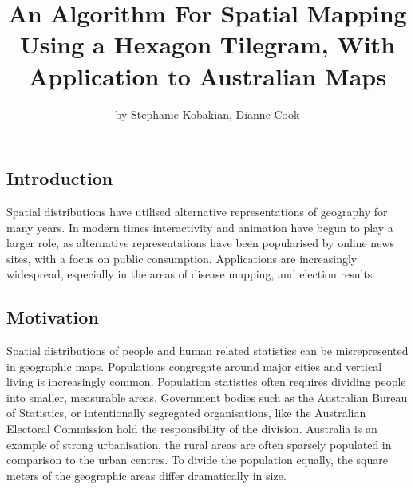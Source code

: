 \title{An Algorithm For Spatial Mapping Using a Hexagon Tilegram, With
Application to Australian Maps}
\author{by Stephanie Kobakian, Dianne Cook}

\maketitle



\hypertarget{introduction}{%
\subsection{Introduction}\label{introduction}}

Spatial distributions have utilised alternative representations of
geography for many years. In modern times interactivity and animation
have begun to play a larger role, as alternative representations have
been popularised by online news sites, with a focus on public
consumption. Applications are increasingly widespread, especially in the
areas of disease mapping, and election results.

\hypertarget{motivation}{%
\subsection{Motivation}\label{motivation}}

Spatial distributions of people and human related statistics can be
misrepresented in geographic maps. Populations congregate around major
cities and vertical living is increasingly common. Population statistics
often requires dividing people into smaller, measurable areas.
Government bodies such as the Australian Bureau of Statistics, or
intentionally segregated organisations, like the Australian Electoral
Commission hold the responsibility of the division. Australia is an
example of strong urbanisation, the rural areas are often sparsely
populated in comparison to the urban centres. To divide the population
equally, the square meters of the geographic areas differ dramatically
in size.


